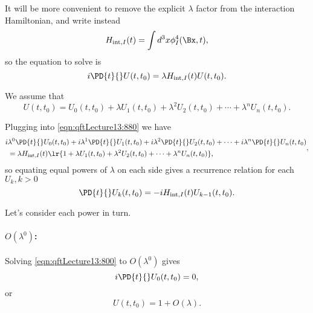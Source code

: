 It will be more convenient to remove the explicit \( \lambda \) factor from the interaction Hamiltonian, and write instead
\begin{equation}\label{eqn:qftLecture13:880}
H_{\text{int}, I}(t) = \int d^3 x \phi_I^4(\Bx, t),
\end{equation}
so the equation to solve is
\begin{equation}\label{eqn:qftLecture13:1220}
i \PD{t}{} U(t, t_0)
=
\lambda H_{\text{int}, I}(t) U(t, t_0).
\end{equation}

We assume that
\begin{equation}\label{eqn:qftLecture13:900}
U(t, t_0)
=
U_0(t, t_0)
+ \lambda U_1(t, t_0)
+ \lambda^2 U_2(t, t_0)
+ \cdots
+ \lambda^n U_n(t, t_0).
\end{equation}

Plugging into \cref{eqn:qftLecture13:880} we have
\begin{equation}\label{eqn:qftLecture13:1160}
\begin{aligned}
  i &\lambda^0 \PD{t}{}U_0(t, t_0)
+ i \lambda^1 \PD{t}{}U_1(t, t_0)
+ i \lambda^2 \PD{t}{}U_2(t, t_0)
+ \cdots
+ i \lambda^n \PD{t}{}U_n(t, t_0) \\
&=
\lambda H_{\text{int}, I}(t)
\lr{
1
+ \lambda U_1(t, t_0)
+ \lambda^2 U_2(t, t_0)
+ \cdots
+ \lambda^n U_n(t, t_0)
},
\end{aligned},
\end{equation}
so
equating equal powers of \( \lambda \) on each side gives a recurrence relation for each \( U_k, k > 0 \)
\begin{equation}\label{eqn:qftLecture13:1180}
\PD{t}{}U_k(t, t_0) = -i H_{\text{int}, I}(t) U_{k-1}(t, t_0).
\end{equation}

Let's consider each power in turn.
\paragraph{\(O(\lambda^0)\):}

Solving \cref{eqn:qftLecture13:800} to \( O(\lambda^0) \) gives
\begin{equation}\label{eqn:qftLecture13:840}
i \PD{t}{} U_0(t, t_0) = 0,
\end{equation}
or
\begin{equation}\label{eqn:qftLecture13:860}
U(t, t_0) = 1 + O(\lambda).
\end{equation}


